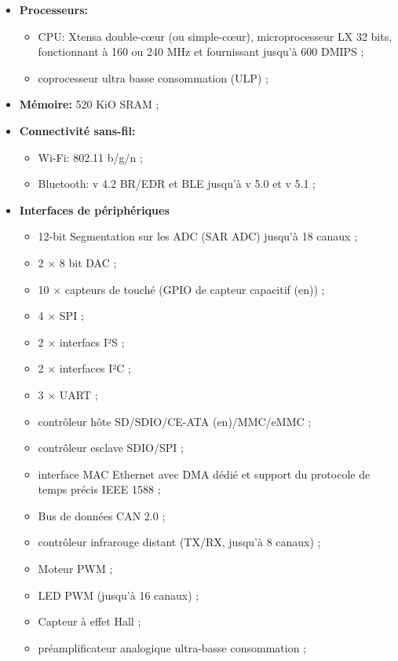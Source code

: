 \begin{itemize}
    \item[\textbullet]\textbf{Processeurs:}
        \begin{itemize}
            \item CPU: Xtensa double-cœur (ou simple-cœur), microprocesseur LX
                32 bits, fonctionnant à 160 ou 240 MHz et fournissant jusqu'à
                600 DMIPS ;

            \item coprocesseur ultra basse consommation (ULP) ;
        \end{itemize}

    \item[\textbullet]\textbf{Mémoire:} 520 KiO SRAM ;

    \item[\textbullet]\textbf{Connectivité sans-fil:}
        \begin{itemize}
            \item Wi-Fi: 802.11 b/g/n ;

            \item Bluetooth: v 4.2 BR/EDR et BLE jusqu'à v 5.0 et v 5.1 ;
        \end{itemize}

    \item[\textbullet]\textbf{Interfaces de périphériques}
        \begin{itemize}
            \item 12-bit Segmentation sur les ADC (SAR ADC) jusqu'à 18 canaux ;
            \item 2 × 8 bit DAC ;
            \item 10 × capteurs de touché (GPIO de capteur capacitif (en)) ;
            \item 4 × SPI ;
            \item 2 × interfacs I²S ;
            \item 2 × interfaces I²C ;
            \item 3 × UART ;
            \item contrôleur hôte SD/SDIO/CE-ATA (en)/MMC/eMMC ;
            \item contrôleur esclave SDIO/SPI ;
            \item interface MAC Ethernet avec DMA dédié et support du protocole
                de temps précis IEEE 1588 ;
            \item Bus de données CAN 2.0 ;
            \item contrôleur infrarouge distant (TX/RX, jusqu'à 8 canaux) ;
            \item Moteur PWM ;
            \item LED PWM (jusqu'à 16 canaux) ;
            \item Capteur à effet Hall ;
            \item préamplificateur analogique ultra-basse consommation ;
        \end{itemize}


\end{itemize}
